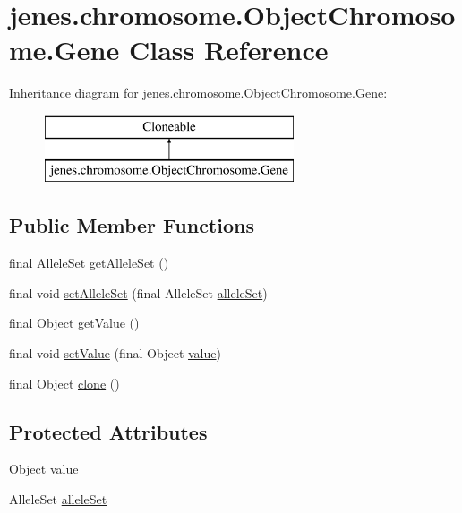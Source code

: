 \hypertarget{classjenes_1_1chromosome_1_1_object_chromosome_1_1_gene}{\section{jenes.\-chromosome.\-Object\-Chromosome.\-Gene Class Reference}
\label{classjenes_1_1chromosome_1_1_object_chromosome_1_1_gene}
}
Inheritance diagram for jenes.\-chromosome.\-Object\-Chromosome.\-Gene\-:\begin{figure}[H]
\begin{center}
\leavevmode
\includegraphics[height=2.000000cm]{classjenes_1_1chromosome_1_1_object_chromosome_1_1_gene}
\end{center}
\end{figure}
\subsection*{Public Member Functions}
\begin{DoxyCompactItemize}
\item 
final Allele\-Set \hyperlink{classjenes_1_1chromosome_1_1_object_chromosome_1_1_gene_abff8ba178d41215a409c1105fb258078}{get\-Allele\-Set} ()
\item 
final void \hyperlink{classjenes_1_1chromosome_1_1_object_chromosome_1_1_gene_a38d07b4386798f456e02b0523b8ed2e2}{set\-Allele\-Set} (final Allele\-Set \hyperlink{classjenes_1_1chromosome_1_1_object_chromosome_1_1_gene_a392d5ec4a86ae43a2bcda010bfa7256b}{allele\-Set})
\item 
final Object \hyperlink{classjenes_1_1chromosome_1_1_object_chromosome_1_1_gene_a8d7fdcee3b2afb3bbbb8d3c735a3091d}{get\-Value} ()
\item 
final void \hyperlink{classjenes_1_1chromosome_1_1_object_chromosome_1_1_gene_aae975ffe31a424c7af308a5f9fb1ef7d}{set\-Value} (final Object \hyperlink{classjenes_1_1chromosome_1_1_object_chromosome_1_1_gene_a1f5727f2d06e896665bd77c5b93a78a2}{value})
\item 
final Object \hyperlink{classjenes_1_1chromosome_1_1_object_chromosome_1_1_gene_a9e0e9f30b3700d5703e568d17bc4e0e5}{clone} ()
\end{DoxyCompactItemize}
\subsection*{Protected Attributes}
\begin{DoxyCompactItemize}
\item 
Object \hyperlink{classjenes_1_1chromosome_1_1_object_chromosome_1_1_gene_a1f5727f2d06e896665bd77c5b93a78a2}{value}
\item 
Allele\-Set \hyperlink{classjenes_1_1chromosome_1_1_object_chromosome_1_1_gene_a392d5ec4a86ae43a2bcda010bfa7256b}{allele\-Set}
\end{DoxyCompactItemize}

